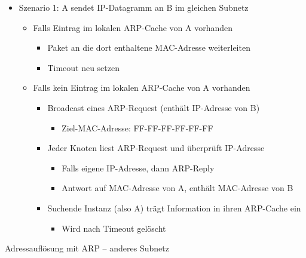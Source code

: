       \begin{itemize}
        \item Szenario 1: A sendet IP-Datagramm an B im gleichen Subnetz
          \begin{itemize}
            \item Falls Eintrag im lokalen ARP-Cache von A vorhanden
              \begin{itemize}
                \item Paket an die dort enthaltene MAC-Adresse weiterleiten
                \item Timeout neu setzen
              \end{itemize}
            \item Falls kein Eintrag im lokalen ARP-Cache von A vorhanden
              \begin{itemize}
                \item Broadcast eines ARP-Request (enthält IP-Adresse von B)
                  \begin{itemize}
                    \item Ziel-MAC-Adresse: FF-FF-FF-FF-FF-FF
                  \end{itemize}
                \item Jeder Knoten liest ARP-Request und überprüft IP-Adresse
                  \begin{itemize}
                    \item Falls eigene IP-Adresse, dann ARP-Reply
                    \item Antwort auf MAC-Adresse von A, enthält MAC-Adresse von B
                  \end{itemize}
                \item Suchende Instanz (also A) trägt Information in ihren ARP-Cache ein
                  \begin{itemize}
                    \item Wird nach Timeout gelöscht
                  \end{itemize}
              \end{itemize}
          \end{itemize}
      \end{itemize}
      Adressauflösung mit ARP -- anderes Subnetz
